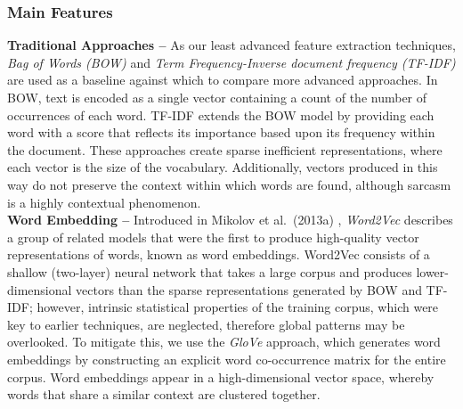\documentclass[12pt,a4paper]{article}
\begin{document}
\subsubsection{Main Features}
\noindent \textbf{Traditional Approaches --} As our least advanced feature extraction techniques, \textit{Bag of Words (BOW)} and \textit{Term Frequency-Inverse document frequency (TF-IDF)} \cite{robertson1976relevance} are used as a baseline against which to compare more advanced approaches. In BOW, text is encoded as a single vector containing a count of the number of occurrences of each word. TF-IDF extends the BOW model by providing each word with a score that reflects its importance based upon its frequency within the document. These approaches create sparse inefficient representations, where each vector is the size of the vocabulary. Additionally, vectors produced in this way do not preserve the context within which words are found, although sarcasm is a highly contextual phenomenon.\\

\noindent \textbf{Word Embedding --} Introduced in Mikolov et al.\ (2013a) \cite{mikolov2013efficient}, \textit{Word2Vec} describes a group of related models that were the first to produce high-quality vector representations of words, known as word embeddings. Word2Vec consists of a shallow (two-layer) neural network that takes a large corpus and produces lower-dimensional vectors than the sparse representations generated by BOW and TF-IDF; however, intrinsic statistical properties of the training corpus, which were key to earlier techniques, are neglected, therefore global patterns may be overlooked. To mitigate this, we use the \textit{GloVe} \cite{pennington2014glove} approach, which generates word embeddings by constructing an explicit word co-occurrence matrix for the entire corpus. Word embeddings appear in a high-dimensional vector space, whereby words that share a similar context are clustered together.\\
\end{document}
